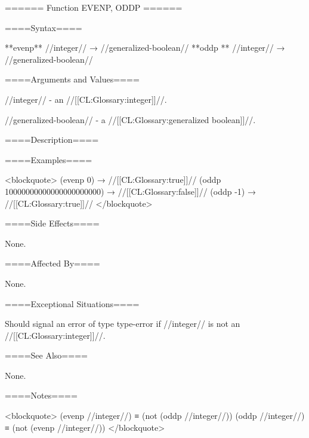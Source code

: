 ====== Function EVENP, ODDP ======

====Syntax====

**evenp** //integer// → //generalized-boolean// **oddp ** //integer// → //generalized-boolean//

====Arguments and Values====

//integer// - an //[[CL:Glossary:integer]]//.

//generalized-boolean// - a //[[CL:Glossary:generalized boolean]]//.

====Description====



====Examples====

<blockquote> (evenp 0) → //[[CL:Glossary:true]]// (oddp 10000000000000000000000) → //[[CL:Glossary:false]]// (oddp -1) → //[[CL:Glossary:true]]// </blockquote>

====Side Effects====

None.

====Affected By====

None.

====Exceptional Situations====

Should signal an error of type type-error if //integer// is not an //[[CL:Glossary:integer]]//.

====See Also====

None.

====Notes====

<blockquote> (evenp //integer//) ≡ (not (oddp //integer//)) (oddp //integer//) ≡ (not (evenp //integer//)) </blockquote>

